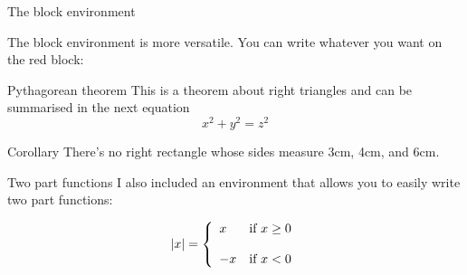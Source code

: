 \begin{frame}{The block environment}

The block environment is more versatile. You can write whatever you want on the red block:

\begin{block}{Pythagorean theorem}
This is a theorem about right triangles and can be summarised in the next 
equation 
\[ x^2 + y^2 = z^2 \]
\end{block}

\begin{block}{Corollary}
There's no right rectangle whose sides measure 3cm, 4cm, and 6cm.
\end{block}

\end{frame}


\begin{frame}{Two part functions}
I also included an environment that allows you to easily write two part functions:

$$|x| =\left\{ \begin{array}{ll} x & \mbox{if } x \geq 0 \\ \\ -x & \mbox{if } x < 0 \end{array} \right.$$

\end{frame}


